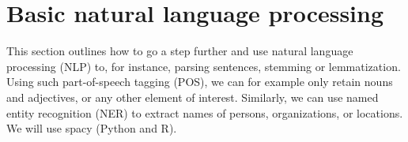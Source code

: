 \section{Basic natural language processing}
\label{sec:nlp}


This section outlines how to go a step further and use natural language processing (NLP) to, for instance, parsing sentences, stemming or lemmatization. Using such part-of-speech tagging (POS), we can for example only retain nouns and adjectives, or any other element of interest. Similarly, we can use named entity recognition (NER) to extract names of persons, organizations, or locations. We will use spacy (Python and R).